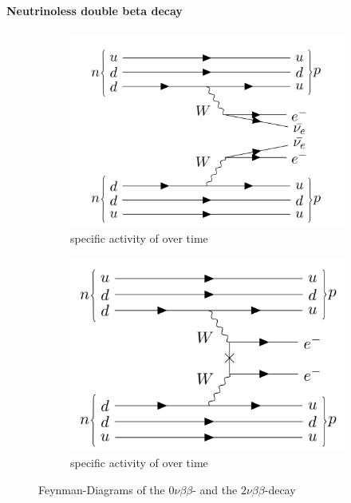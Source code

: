 \paragraph{Neutrinoless double beta decay}

\WarningsOff
\begin{figure}[ht]
\centering
\begin{subfigure}{.5\textwidth}
\centering
		\includegraphics[width=\textwidth]{./Bilder/2nubetabeta.png}
		\caption{specific activity of \Kr over time}
		\label{fig:activity}
\label{fig:Feyn2nbb}
\end{subfigure}\hfill%
\begin{subfigure}{.5\textwidth}
\centering
		\includegraphics[width=\textwidth]{./Bilder/0nubetabeta.png}
		\caption{specific activity of \Kr over time}
		\label{fig:Feyn0nbb}
\end{subfigure}
\caption{Feynman-Diagrams of the $0\nu\beta\beta$- and the $2\nu\beta\beta$-decay}
\end{figure}
\WarningsOn

